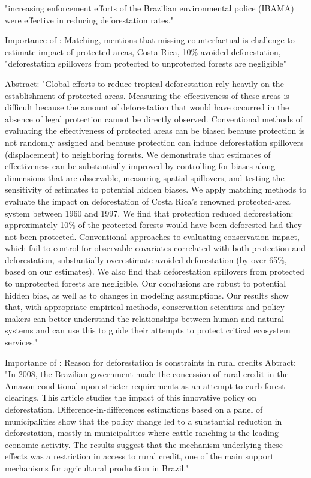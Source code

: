 \documentclass{article}
\begin{document}
\citep{hargrave2013economic} "increasing enforcement efforts of the Brazilian environmental police (IBAMA) were effective in reducing deforestation rates."

Importance of \citep{andam2008measuring}: Matching, mentions that missing counterfactual is challenge to estimate impact of protected areas, Costa Rica, 10\% avoided deforestation, "deforestation spillovers from protected to unprotected forests are negligible"

Abstract: "Global efforts to reduce tropical deforestation rely heavily on the
establishment of protected areas. Measuring the effectiveness of
these areas is difficult because the amount of deforestation that
would have occurred in the absence of legal protection cannot be
directly observed. Conventional methods of evaluating the effectiveness
of protected areas can be biased because protection is not
randomly assigned and because protection can induce deforestation
spillovers (displacement) to neighboring forests. We demonstrate
that estimates of effectiveness can be substantially improved
by controlling for biases along dimensions that are
observable, measuring spatial spillovers, and testing the sensitivity
of estimates to potential hidden biases. We apply matching methods
to evaluate the impact on deforestation of Costa Rica’s renowned
protected-area system between 1960 and 1997. We find
that protection reduced deforestation: approximately 10\% of the
protected forests would have been deforested had they not been
protected. Conventional approaches to evaluating conservation
impact, which fail to control for observable covariates correlated
with both protection and deforestation, substantially overestimate
avoided deforestation (by over 65\%, based on our estimates).
We also find that deforestation spillovers from protected to unprotected
forests are negligible. Our conclusions are robust to
potential hidden bias, as well as to changes in modeling assumptions.
Our results show that, with appropriate empirical methods,
conservation scientists and policy makers can better understand
the relationships between human and natural systems and can use
this to guide their attempts to protect critical ecosystem services."





Importance of \citep{assunccao2020effect}: Reason for deforestation is constraints in rural credits
Abtract: "In 2008, the Brazilian government made the concession of rural credit in the Amazon conditional upon stricter requirements as an attempt to curb forest clearings. This article studies the impact of this innovative policy on deforestation. Difference-in-differences estimations based on a panel of municipalities show that the policy change led to a substantial reduction in deforestation, mostly in municipalities where cattle ranching is the leading economic activity. The results suggest that the mechanism underlying these effects was a restriction in access to rural credit, one of the main support mechanisms for agricultural production in Brazil."
\end{document}

